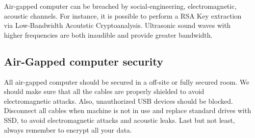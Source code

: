 Air-gapped computer can be breached by social-engineering, electromagnetic, acoustic channels.
For instance, it is possible to perform a RSA Key extraction via Low-Bandwidth Acoutstic Cryptoanalysis. Ultrasonic sound waves with higher frequencies are both inaudible and provide greater bandwidth. 

\subsection{Air-Gapped computer security}
All air-gapped computer should be secured in a off-site or fully secured room. We should make sure that all the cables are properly shielded to avoid electromagnetic attacks. Also, unauthorized USB devices should be blocked. Disconnect all cables when machine is not in use and replace standard drives with SSD, to avoid electromagnetic attacks and acoustic leaks. Last but not least, always remember to encrypt all your data. 




